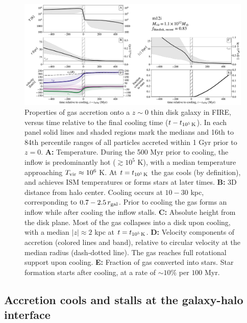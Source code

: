 \documentclass[fleqn,usenatbib]{mnras}
\newcommand{\tcon}{t_{10^5\,{\rm K}}}
\newcommand{\Tvir}{T_{\rm vir}}
\begin{document}
\begin{figure}
\includegraphics[width=\textwidth]{figures/before_and_after/before_and_after_characteristics_m12i_md.pdf}
\caption{
Properties of gas accretion onto a $z\sim0$ thin disk galaxy in FIRE, versus time relative to the final cooling time ($t - \tcon$).
In each panel solid lines and shaded regions mark the medians and 16th to 84th percentile ranges of all particles accreted within 1 Gyr prior to $z=0$. 
\textbf{A:}
Temperature.
During the 500 Myr prior to cooling, the inflow is predominantly hot ($\gtrsim 10^5$ K), with a median temperature approaching $\Tvir\approx10^6$ K.
At $t = \tcon$ the gas cools (by definition), and achieves ISM temperatures or forms stars at later times. 
\textbf{B:}
3D distance from halo center.
Cooling occurs at $10-30$ kpc, corresponding to $0.7-2.5\,r_{\rm gal}$.
Prior to cooling the gas forms an inflow while after cooling the inflow stalls.
\textbf{C:}
Absolute height from the disk plane.
Most of the gas collapses into a disk upon cooling, with a median $\vert z \vert \approx 2$ kpc at $t=\tcon$.
\textbf{D:}
Velocity components of accretion (colored lines and band), relative to circular velocity at the median radius (dash-dotted line).
The gas reaches full rotational support upon cooling.
\textbf{E:}
Fraction of gas converted into stars.
Star formation starts after cooling, at a rate of $\sim10\%$ per $100$ Myr. 
}
\label{f: before and after A}
\end{figure}


\subsection{Accretion cools and stalls at the galaxy-halo interface}
\label{s: characteristics -- cools}
\end{document}
